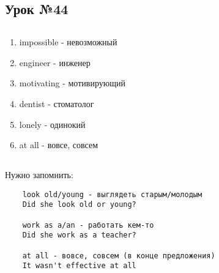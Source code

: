 \subsection{Урок №44}

\subsection*{}
\begin{multicols}{2}
    \begin{enumerate}\setlength{\itemsep}{0pt}
        \item impossible - невозможный
        \item engineer - инженер
        \item motivating - мотивирующий
        \item dentist - стоматолог
        \item lonely - одинокий
        \item at all - вовсе, совсем
    \end{enumerate}
\end{multicols}

\subsection*{}
Нужно запомнить:
\begin{verbatim}
    look old/young - выглядеть старым/молодым
    Did she look old or young?

    work as a/an - работать кем-то
    Did she work as a teacher?

    at all - вовсе, совсем (в конце предложения)
    It wasn't effective at all
\end{verbatim}